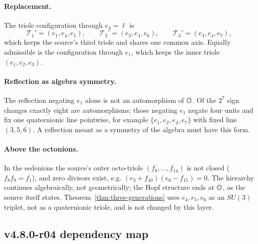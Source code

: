 \paragraph{Replacement.}
The triole configuration through \(e_4=\ell\) is
\[
\mathcal T_1'=(e_1,e_4,e_5),\qquad \mathcal T_2'=(e_2,e_4,e_6),\qquad
\mathcal T_3'=(e_3,e_4,e_7),
\]
which keeps the source's third triole and shares one common axis.  Equally admissible is the
configuration through \(e_1\), which keeps the inner triole \((e_1,e_2,e_3)\).

\paragraph{Reflection as algebra symmetry.}
The reflection negating \(e_1\) alone is not an automorphism of \(\mathbb{O}\).  Of the
\(2^7\) sign changes exactly eight are automorphisms; those negating \(e_1\) negate four units
and fix one quaternionic line pointwise, for example \(\{e_1,e_2,e_4,e_7\}\) with fixed line
\((3,5,6)\).  A reflection meant as a symmetry of the algebra must have this form.

\paragraph{Above the octonions.}
In the sedenions the source's outer octo-triole \((f_8,\dots,f_{14})\) is not closed
(\(f_8f_9=f_1\)), and zero divisors exist, e.g. \((e_3+f_{10})(e_6-f_{15})=0\).  The hierarchy
continues algebraically, not geometrically; the Hopf structure ends at \(\mathbb{O}\), as the source
itself states.  Theorem~\ref{thm:three-generations} uses \(e_4,e_5,e_6\) as an \(SU(3)\)
triplet, not as a quaternionic triole, and is not changed by this layer.

\subsection*{v4.8.0-r04 dependency map}
\label{subsec:v480-r04-dependency-map}

